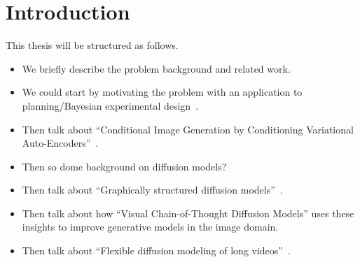 \chapter{Introduction}
\label{ch:introduction}


This thesis will be structured as follows.
\begin{itemize}
    \item We briefly describe the problem background and related work.
    \item We could start by motivating the problem with an application to planning/Bayesian experimental design~\citep{harvey2022near,harvey2021conditional}.
    \item Then talk about ``Conditional Image Generation by Conditioning Variational Auto-Encoders''~\citep{harvey2021conditional}.
    \item Then so dome background on diffusion models?
    \item Then talk about ``Graphically structured diffusion models''~\citep{weilbach2023graphically}.
    \item Then talk about how ``Visual Chain-of-Thought Diffusion Models''\citep{harvey2023visual} uses these insights to improve generative models in the image domain.
    \item Then talk about ``Flexible diffusion modeling of long videos''~\citep{harvey2022flexible}.
\end{itemize}

\endinput

Any text after an \endinput is ignored.
You could put scraps here or things in progress.
